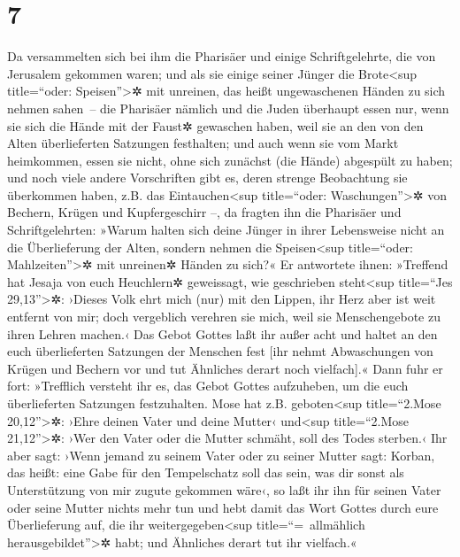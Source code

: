 \hypertarget{section-6}{%
\section{7}\label{section-6}}

 Da versammelten sich bei ihm die Pharisäer und einige
Schriftgelehrte, die von Jerusalem gekommen waren;  und
als sie einige seiner Jünger die Brote\textless sup title=``oder:
Speisen''\textgreater✲ mit unreinen, das heißt ungewaschenen Händen zu
sich nehmen sahen~--  die Pharisäer nämlich und die Juden
überhaupt essen nur, wenn sie sich die Hände mit der Faust✲ gewaschen
haben, weil sie an den von den Alten überlieferten Satzungen festhalten;
 und auch wenn sie vom Markt heimkommen, essen sie nicht,
ohne sich zunächst (die Hände) abgespült zu haben; und noch viele andere
Vorschriften gibt es, deren strenge Beobachtung sie überkommen haben,
z.B. das Eintauchen\textless sup title=``oder: Waschungen''\textgreater✲
von Bechern, Krügen und Kupfergeschirr --,  da fragten ihn
die Pharisäer und Schriftgelehrten: »Warum halten sich deine Jünger in
ihrer Lebensweise nicht an die Überlieferung der Alten, sondern nehmen
die Speisen\textless sup title=``oder: Mahlzeiten''\textgreater✲ mit
unreinen✲ Händen zu sich?«  Er antwortete ihnen: »Treffend
hat Jesaja von euch Heuchlern✲ geweissagt, wie geschrieben
steht\textless sup title=``Jes 29,13''\textgreater✲: ›Dieses Volk ehrt
mich (nur) mit den Lippen, ihr Herz aber ist weit entfernt von mir;
 doch vergeblich verehren sie mich, weil sie
Menschengebote zu ihren Lehren machen.‹  Das Gebot Gottes
laßt ihr außer acht und haltet an den euch überlieferten Satzungen der
Menschen fest {[}ihr nehmt Abwaschungen von Krügen und Bechern vor und
tut Ähnliches derart noch vielfach{]}.«  Dann fuhr er
fort: »Trefflich versteht ihr es, das Gebot Gottes aufzuheben, um die
euch überlieferten Satzungen festzuhalten.  Mose hat z.B.
geboten\textless sup title=``2.Mose 20,12''\textgreater✲: ›Ehre deinen
Vater und deine Mutter‹ und\textless sup title=``2.Mose
21,12''\textgreater✲: ›Wer den Vater oder die Mutter schmäht, soll des
Todes sterben.‹  Ihr aber sagt: ›Wenn jemand zu seinem
Vater oder zu seiner Mutter sagt: Korban, das heißt: eine Gabe für den
Tempelschatz soll das sein, was dir sonst als Unterstützung von mir
zugute gekommen wäre‹,  so laßt ihr ihn für seinen Vater
oder seine Mutter nichts mehr tun  und hebt damit das
Wort Gottes durch eure Überlieferung auf, die ihr
weitergegeben\textless sup title=``=~allmählich
herausgebildet''\textgreater✲ habt; und Ähnliches derart tut ihr
vielfach.«

